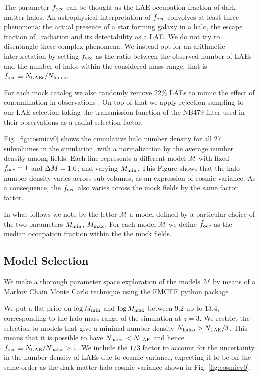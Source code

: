 \documentclass{emulateapj}
\newcommand{\ly}{{\ifmmode{{\rm Ly}\alpha}\else{Ly$\alpha$}\fi}}
\newcommand{\mmin}{{\ifmmode{{M_{\rm min}}}\else{${M_{\rm min}}$}\fi}}
\newcommand{\mmax}{{\ifmmode{{M_{\rm max}}}\else{${M_{\rm max}}$}\fi}}
\newcommand{\dm}{{\ifmmode{{\Delta M}}\else{$\Delta M$}\fi}}
\newcommand{\focc}{{\ifmmode{{f_{\rm occ}}}\else{${f_{\rm occ}}$}\fi}}
\begin{document}
The parameter $\focc$ can be thought as the LAE occupation fraction of
dark matter halos.
An astrophysical interpretation of $f_{\rm occ}$ convolves at least
three phenomena: the actual presence of a star forming galaxy in a
halo, the escape fraction of \ly\ radiation and its detectability as
a LAE.   
We do not try to disentangle these complex phenomena.
We instead opt for an arithmetic interpretation by setting $\focc$ as
the ratio between the observed number of LAEs and the number of halos
within the considered mass range, that is $\focc \equiv N_{\rm
  LAEs}/N_{\mathrm{halos}}$.   

For each mock catalog we also randomly remove $22\%$ LAEs to mimic the
effect of contamination in observations \citet{Bielby16}.
On top of that we apply rejection sampling  to our LAE selection
taking the transmission function of the NB479 filter used in their
observations as a radial selection factor. 


Fig. \ref{fig:cosmicv0}  shows the cumulative halo number density
for all 27 subvolumes in the simulation, with a normalization by the
average number density among fields. 
Each line represents a different model $\mathcal{M}$ with fixed
$\focc=1$ and $\dm=1.0$; and varying $\mmin$, 
This Figure shows that the halo number density varies across
sub-volumes, as an expression of cosmic variance. 
As a consequence, the $\focc$ also varies across the mock fields  
by the same factor factor. 



In what follows we note by the letter ${\mathcal M}$ a model
defined by a particular choice of the two parameters $M_{\rm min}$, 
$M_{\rm  max}$. For each model  ${\mathcal M}$ we define
$\tilde{f}_{\rm occ}$ as the median occupation fraction within the the
mock fields.

\subsection{Model Selection}
\label{subsec:explore}



We make a thorough parameter space exploration of the models
${\mathcal M}$ by  means of a Markov Chain Monte Carlo technique using
the EMCEE python package \citep{emcee2013}. 

We put a flat prior on $\log M_{\rm min}$ and $\log \mmax$ between
$9.2$ up to $13.4$, corresponding to the halo mass range of 
the simulation at $z=3$.  
We restrict the selection to models that give a minimal number density 
$N_{\rm{halos}}>N_{\rm LAE}/3$.   
This means that it is possible to have $N_{\rm{halos}} < N_{\rm LAE}$
and hence $\focc\equiv N_{\rm{LAE}}/N_{\rm{halos}}>1$.   
We include the $1/3$ factor to account for the uncertainty in the number 
density of LAEs due to cosmic variance, expecting it to be on the
same order as the dark matter halo cosmic variance shown in
Fig. \ref{fig:cosmicv0}.   
\end{document}
